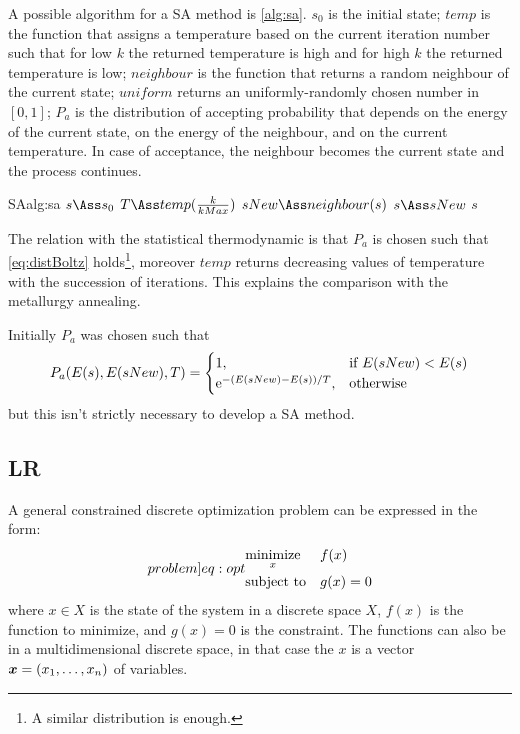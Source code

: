 \documentclass[dissertation.tex]{subfiles}
\begin{document}
A possible algorithm for a \ac{SA} method is \cref{alg:sa}. $s_0$ is
the initial state; $temp$ is the function that assigns a
temperature based on the current iteration number such that for low
$k$ the returned temperature is high and for high $k$ the returned temperature
is low; $neighbour$ is the function that returns a random neighbour of
the current state; $uniform$ returns an uniformly-randomly chosen
number in $[0,1]$; $P_a$ is the distribution of accepting probability
that depends on the energy of the current state, on the energy of the
neighbour, and on the current temperature. In case of acceptance, the
neighbour becomes the current state and the process continues.

\begin{algo}{\acf{SA}}{alg:sa}
  \State $s\Ass s_0$
  \State $T\Ass temp(\frac{k}{kMax})$
  \State $sNew\Ass neighbour(s)$
  \State $s\Ass sNew$
  \EndIf
  \EndFor
  \State\Return $s$
  \EndFunction
\end{algo}
The relation with the statistical thermodynamic is that $P_a$ is chosen
such that
\cref{eq:distBoltz} holds\footnote{A similar distribution is enough.},
moreover $temp$ returns decreasing values of
temperature with the succession of iterations. This explains the
comparison with the metallurgy annealing.

Initially $P_a$ was chosen such that
\begin{equation*}
  P_a(E(s), E(sNew), T)=
  \begin{cases}
    1,& \text{if }E(sNew)<E(s)\\
    \mathrm{e}^{-(E(sNew)-E(s))/T},& \text{otherwise}
  \end{cases}
\end{equation*}
but this isn't strictly necessary to develop a \ac{SA} method.

\subsection{\acf{LR}}\label{sec:lagrangianRelaxation}
A general constrained discrete optimization problem can be expressed in
the form:
\begin{equation}\label[problem]{eq:opt}
\begin{aligned}
& \underset{x}{\text{minimize}}
& & f(x) \\
& \text{subject to}
& & g(x)=0
\end{aligned}
\end{equation}
where $x\in X$ is the state of the system in a discrete space $X$, $f(x)$
is the function to
minimize, and $g(x)=0$ is the constraint. The functions can also be
in a multidimensional discrete space, in that case the $x$ is a vector
$\boldsymbol{x}=(x_1,\dots,x_n)$ of variables.
\end{document}
